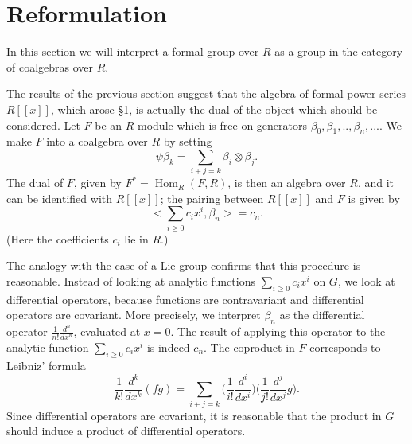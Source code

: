\documentclass[../main]{subfiles}
\begin{document}
\label{sec:p2c3}

\chapter{Reformulation}

In this section we will interpret a formal group over $R$ as a group in the category of coalgebras over $R$.

The results of the previous section suggest that the algebra of formal power series $R[[x]]$, which arose \hyperref[sec:p2c1]{\S 1}, is actually the dual of the object which should be considered. Let $F$ be an $R$-module which is free on generators $\beta_0,\beta_1,..,\beta_n,...$. We make $F$ into a coalgebra over $R$ by setting
\begin{equation}
\label{eqn:p2c03.1}
\tag{3.1}
\psi\beta_k=\sum_{i+j=k}\beta_i\otimes\beta_j.
\end{equation}
The dual of $F$, given by $F^\ast=\operatorname{Hom}_R(F,R)$, is then an algebra over $R$, and it can be identified with $R[[x]]$; the pairing between $R[[x]]$ and $F$ is given by 
\begin{equation}
\label{eqn:p2c03.2}
\tag{3.2}
\Big<\sum_{i\geq 0}c_ix^i,\beta_n\Big>=c_n.    
\end{equation}
(Here the coefficients $c_i$ lie in $R$.)

The analogy with the case of a Lie group confirms that this procedure is reasonable. Instead of looking at analytic functions $\displaystyle\sum_{i\geq 0}c_ix^i$ on $G$, we look at differential operators, because functions are contravariant and differential operators are covariant. More precisely, we interpret $\beta_n$ as the differential operator $\frac{1}{n!}\frac{d^n}{dx^n}$, evaluated at $x=0$. The result of applying this operator to the analytic function $\displaystyle\sum_{i\geq 0}c_ix^i$ is indeed $c_n$. The coproduct in $F$ corresponds to Leibniz' formula
\[\frac{1}{k!}\frac{d^k}{dx^k}(fg)=\sum_{i+j=k}\Big(\frac{1}{i!}\frac{d^i}{dx^i}\Big)\Big(\frac{1}{j!}\frac{d^j}{dx^j}g\Big).\]
Since differential operators are covariant, it is reasonable that the product in $G$ should induce a product of differential operators. 
\end{document}
